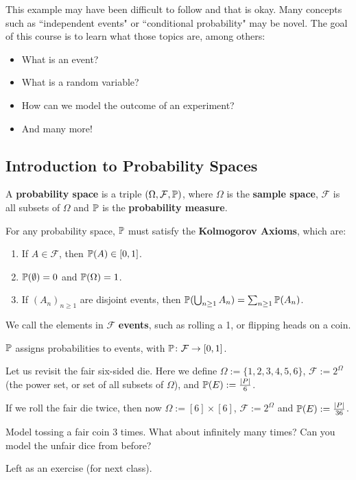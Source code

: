 This example may have been difficult to follow and that is okay. Many concepts such as ``independent events" or ``conditional probability" may be novel. The goal of this course is to learn what those topics are, among others:
\begin{itemize}
   \item What is an event?
   \item What is a random variable?
   \item How can we model the outcome of an experiment?
   \item And many more!
\end{itemize}

\subsection{Introduction to Probability Spaces}

\begin{defbox}
A \textbf{probability space} is a triple $(\Omega, \mathcal{F}, \mathbb{P})$, where $\Omega$ is the \textbf{sample space}, $\mathcal{F}$ is all subsets of $\Omega$ and $\mathbb{P}$ is the \textbf{probability measure}. 

For any probability space, $\mathbb{P}$ must satisfy the \textbf{Kolmogorov Axioms}, which are:
\begin{enumerate}
   \item If $A \in \mathcal{F}$, then $\mathbb{P}(A) \in [0, 1]$.
   \item $\mathbb{P}(\emptyset) = 0$ and $\mathbb{P}(\Omega) = 1$.
   \item If $(A_n)_{n \geq 1}$ are disjoint events, then $\mathbb{P}(\bigcup_{n \geq 1}A_n) = \sum_{n\geq1}\mathbb{P}(A_n)$.
\end{enumerate}
\end{defbox}

We call the elements in $\mathcal{F}$ \textbf{events}, such as rolling a 1, or flipping heads on a coin.

$\mathbb{P}$ assigns probabilities to events, with $\mathbb{P} \colon \mathcal{F} \to [0,1]$. 

\begin{example}
   Let us revisit the fair six-sided die. Here we define $\Omega := \{1,2,3,4,5,6\}$, $\mathcal{F} := 2^\Omega$ (the power set, or set of all subsets of $\Omega$), and $\mathbb{P}(E) := \frac{|P|}{6}$.

   If we roll the fair die twice, then now $\Omega := [6] \times [6]$, $\mathcal{F} := 2^\Omega$ and $\mathbb{P}(E) := \frac{|P|}{36}$.
\end{example}

\begin{example}
   Model tossing a fair coin 3 times. What about infinitely many times? Can you model the unfair dice from before?
\end{example}
\begin{solution}
   Left as an exercise (for next class).
\end{solution}
